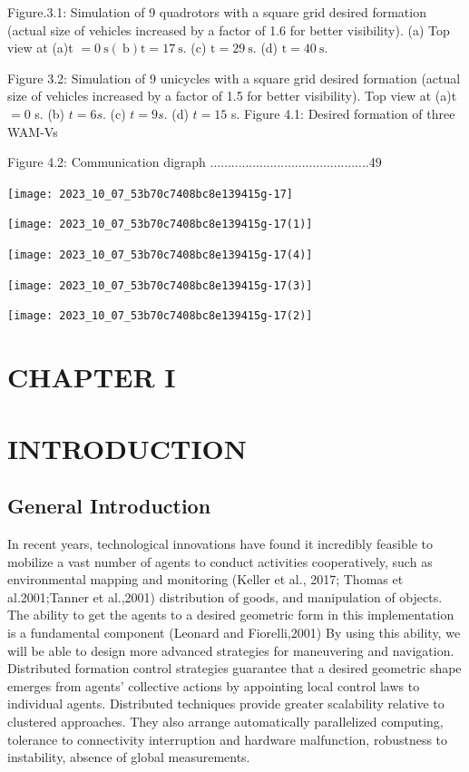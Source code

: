 \documentclass[10pt]{article}
\begin{document}
Figure.3.1: Simulation of 9 quadrotors with a square grid desired formation (actual size of vehicles increased by a factor of 1.6 for better visibility). (a) Top view at (a)t $=0 \mathrm{~s}(\mathrm{~b}) \mathrm{t}=17 \mathrm{~s}$. (c) $\mathrm{t}=29 \mathrm{~s}$. (d) $\mathrm{t}=40 \mathrm{~s}$.

Figure 3.2: Simulation of 9 unicycles with a square grid desired formation (actual size of vehicles increased by a factor of 1.5 for better visibility). Top view at (a)t $=0$ s. (b) $t=6 s$. (c) $t=9 s$. (d) $t=15$ s. Figure 4.1: Desired formation of three WAM-Vs

Figure 4.2: Communication digraph .............................................49

\begin{center}
\texttt{[image: 2023\_10\_07\_53b70c7408bc8e139415g-17]}
\end{center}

\begin{center}
\texttt{[image: 2023\_10\_07\_53b70c7408bc8e139415g-17(1)]}
\end{center}

\begin{center}
\texttt{[image: 2023\_10\_07\_53b70c7408bc8e139415g-17(4)]}
\end{center}

\begin{center}
\texttt{[image: 2023\_10\_07\_53b70c7408bc8e139415g-17(3)]}
\end{center}

\begin{center}
\texttt{[image: 2023\_10\_07\_53b70c7408bc8e139415g-17(2)]}
\end{center}

\section{CHAPTER I}
\section{INTRODUCTION}
\subsection{General Introduction}
In recent years, technological innovations have found it incredibly feasible to mobilize a vast number of agents to conduct activities cooperatively, such as environmental mapping and monitoring (Keller et al., 2017; Thomas et al.2001;Tanner et al.,2001) distribution of goods, and manipulation of objects. The ability to get the agents to a desired geometric form in this implementation is a fundamental component (Leonard and Fiorelli,2001) By using this ability, we will be able to design more advanced strategies for maneuvering and navigation. Distributed formation control strategies guarantee that a desired geometric shape emerges from agents' collective actions by appointing local control laws to individual agents. Distributed techniques provide greater scalability relative to clustered approaches. They also arrange automatically parallelized computing, tolerance to connectivity interruption and hardware malfunction, robustness to instability, absence of global measurements.
\end{document}

